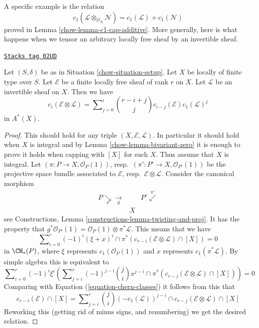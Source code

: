 \medskip\noindent
A specific example is the relation
$$
c_1(\mathcal{L} \otimes_{\mathcal{O}_X} \mathcal{N})
=
c_1(\mathcal{L}) + c_1(\mathcal{N})
$$
proved in Lemma \ref{chow-lemma-c1-cap-additive}.
More generally, here is what happens when we tensor an
arbitrary locally free sheaf by an invertible sheaf.

\begin{lemma}
\label{chow-lemma-chern-classes-E-tensor-L}
\href{https://stacks.math.columbia.edu/tag/02UD}{\texttt{Stacks tag 02UD}}

Let $(S, \delta)$ be as in Situation \ref{chow-situation-setup}.
Let $X$ be locally of finite type over $S$.
Let $\mathcal{E}$ be a finite locally free sheaf of
rank $r$ on $X$. Let $\mathcal{L}$ be an invertible
sheaf on $X$. Then we have
\begin{equation}
\label{equation-twist}
c_i({\mathcal E} \otimes {\mathcal L})
=
\sum\nolimits_{j = 0}^i
\binom{r - i + j}{j} c_{i - j}({\mathcal E}) c_1({\mathcal L})^j
\end{equation}
in $A^*(X)$.
\end{lemma}

\begin{proof}

This should hold for any triple $(X, \mathcal{E}, \mathcal{L})$.
In particular it should hold when $X$ is integral and by
Lemma \ref{chow-lemma-bivariant-zero}
it is enough to prove
it holds when capping with $[X]$ for such $X$. Thus assume
that $X$ is integral. Let $(\pi : P \to X, \mathcal{O}_P(1))$,
resp.\ $(\pi' : P' \to X, \mathcal{O}_{P'}(1))$ be the
projective space bundle associated to $\mathcal{E}$,
resp.\ $\mathcal{E} \otimes \mathcal{L}$. Consider the canonical morphism
$$
\begin{array}{ccc}P \underset{\pi}{\searrow}\underset{g}{\longrightarrow} &  & P' \overset{\pi'}{\swarrow} \\  & X & \end{array}
$$
see Constructions, Lemma \ref{constructions-lemma-twisting-and-proj}.
It has the property that
$g^*\mathcal{O}_{P'}(1)
= \mathcal{O}_P(1) \otimes \pi^* {\mathcal L}$.
This means that we have
$$
\sum\nolimits_{i = 0}^r
(-1)^i
(\xi + x)^i \cap \pi^*(c_{r - i}(\mathcal{E} \otimes \mathcal{L}) \cap [X])
=
0
$$
in $\CH_*(P)$, where $\xi$ represents
$c_1(\mathcal{O}_P(1))$ and $x$
represents $c_1(\pi^*\mathcal{L})$. By simple algebra this
is equivalent to
$$
\sum\nolimits_{i = 0}^r
(-1)^i \xi^i \left(
\sum\nolimits_{j = i}^r
(-1)^{j - i}
\binom{j}{i}
x^{j - i} \cap
\pi^*(c_{r - j}(\mathcal{E} \otimes \mathcal{L}) \cap [X])
\right)
=
0
$$
Comparing with
Equation (\ref{equation-chern-classes}) it follows from this that
$$
c_{r - i}(\mathcal{E}) \cap [X] =
\sum\nolimits_{j = i}^r
\binom{j}{i}
(-c_1(\mathcal{L}))^{j - i} \cap
c_{r - j}(\mathcal{E} \otimes \mathcal{L}) \cap [X]
$$
Reworking this (getting rid of minus signs, and renumbering) we get
the desired relation.
\end{proof}


